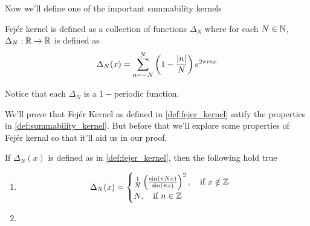   Now we'll define one of the important summability kernels
  \begin{definition}
    \label{def:fejer_kernel}
    Fej\'er kernel is defined as a collection of functions  $\Delta_N$ where for each $N \in \mathbb N$, $\Delta_N : \mathbb R \to \mathbb R$ is defined as 
    \begin{displaymath}
      \Delta_N(x) = \sum_{n=-N}^{N}\left( 1 - \frac{\lvert n\rvert}{N}\right)e^{2\pi inx}
    \end{displaymath}
  \end{definition}
  Notice that each $\Delta_N$ is a $1-$periodic function.

  We'll prove that Fej\'er Kernel as defined in \ref{def:fejer_kernel} satify the properties in \ref{def:summability_kernel}. But before that we'll explore some properties of Fej\'er kernal so that it'll aid us in our proof.
  \begin{proposition}
    \label{prop:properties_of_fejer_kernel}
    If $\Delta_N(x)$ is defined as in \ref{def:fejer_kernel}, then the following hold true
    \begin{enumerate}[label=(\alph*)]
      \item
        \begin{displaymath}
          \Delta_N(x) = 
            \begin{cases}
              \frac{1}{N}\left( \frac{\sin(\pi Nx)}{\sin(\pi x)} \right)^2, \quad \text{if } x\notin \mathbb Z \\
              N, \quad \text{if } n \in \mathbb Z\
            \end{cases}
        \end{displaymath}
      \item 
    \end{enumerate}
  \end{proposition}

